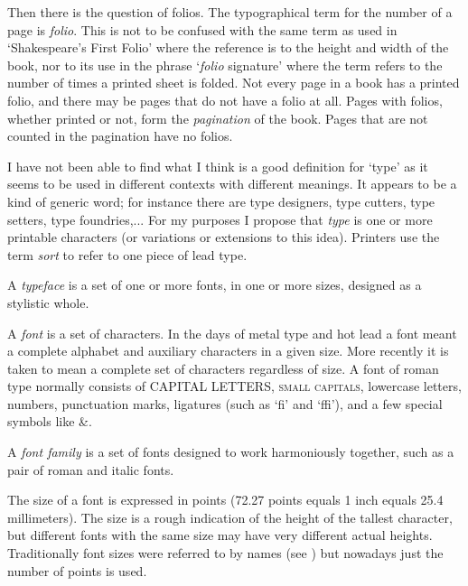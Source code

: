 \documentclass[10pt,letterpaper,extrafontsizes]{memoir}
\begin{document}
   Then there is the question of folios. The typographical term for
the number of a page is \emph{folio}.
This is not to be confused with
the same term as used in `Shakespeare's First Folio' where the reference is
to the height and width of the book, nor to its use in the phrase
`\emph{folio} signature' where the term refers to the 
number of times a printed sheet is folded. 
Not every page in a book has a printed
folio, and there may be pages that do not have a folio at all. Pages with
folios, whether printed or not, form the \emph{pagination} 
of the book. Pages
that are not counted in the pagination have no folios.

 I have not been able to find what I think is a good
definition for `type' as it seems to be used in different contexts with
different meanings. It appears to be a kind of generic word; for instance
there are type designers, type cutters, type setters, type foundries,...
For my purposes I propose that \emph{type} is 
one or more printable characters (or variations or extensions to this idea).  
Printers use the term \emph{sort} to refer to one piece of lead
type.

   A \emph{typeface} is a set of one or more fonts, in one
or more sizes, designed as a stylistic whole. 

   A \emph{font} is a set of characters. In the days of 
metal type and hot lead a font meant a complete alphabet and auxiliary
characters in a given size. More recently it is taken to mean a complete
set of characters regardless of size. A font of roman type normally
consists of CAPITAL LETTERS, \textsc{small capitals}, lowercase letters,
numbers, punctuation marks, ligatures (such as `fi' and `ffi'), and a
few special symbols like \&.

   A \emph{font family} is a set of fonts designed to
work harmoniously together, such as a pair of roman and italic fonts.

   The size of a font is expressed in points 
(72.27 points equals 1 inch
equals 25.4 millimeters). The size is a rough indication of the height
of the tallest character, but different fonts with the same size may have
very different actual heights. Traditionally font sizes were referred to
by names (see ) but nowadays just the number of points 
is used.
\end{document}
